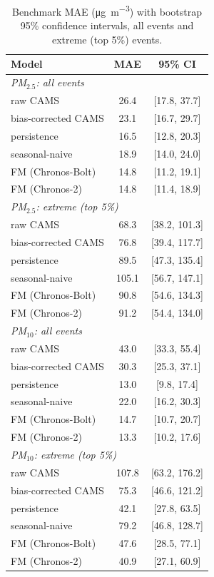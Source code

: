 \documentclass[11pt]{article}
\begin{document}
\begin{table}[htbp]\centering\footnotesize
\caption{Benchmark MAE (\si{\micro\gram\per\cubic\metre}) with bootstrap 95\% confidence intervals, all events and extreme (top 5\%) events.}
\begin{tabular}{lcc}\toprule
Model & MAE & 95\% CI \\ \midrule
\multicolumn{3}{l}{\textit{PM$_{2.5}$: all events}} \\
raw CAMS & 26.4 & [17.8, 37.7] \\
bias-corrected CAMS & 23.1 & [16.7, 29.7] \\
persistence & 16.5 & [12.8, 20.3] \\
seasonal-naive & 18.9 & [14.0, 24.0] \\
FM (Chronos-Bolt) & 14.8 & [11.2, 19.1] \\
FM (Chronos-2) & 14.8 & [11.4, 18.9] \\
\multicolumn{3}{l}{\textit{PM$_{2.5}$: extreme (top 5\%)}} \\
raw CAMS & 68.3 & [38.2, 101.3] \\
bias-corrected CAMS & 76.8 & [39.4, 117.7] \\
persistence & 89.5 & [47.3, 135.4] \\
seasonal-naive & 105.1 & [56.7, 147.1] \\
FM (Chronos-Bolt) & 90.8 & [54.6, 134.3] \\
FM (Chronos-2) & 91.2 & [54.4, 134.0] \\
\multicolumn{3}{l}{\textit{PM$_{10}$: all events}} \\
raw CAMS & 43.0 & [33.3, 55.4] \\
bias-corrected CAMS & 30.3 & [25.3, 37.1] \\
persistence & 13.0 & [9.8, 17.4] \\
seasonal-naive & 22.0 & [16.2, 30.3] \\
FM (Chronos-Bolt) & 14.7 & [10.7, 20.7] \\
FM (Chronos-2) & 13.3 & [10.2, 17.6] \\
\multicolumn{3}{l}{\textit{PM$_{10}$: extreme (top 5\%)}} \\
raw CAMS & 107.8 & [63.2, 176.2] \\
bias-corrected CAMS & 75.3 & [46.6, 121.2] \\
persistence & 42.1 & [27.8, 63.5] \\
seasonal-naive & 79.2 & [46.8, 128.7] \\
FM (Chronos-Bolt) & 47.6 & [28.5, 77.1] \\
FM (Chronos-2) & 40.9 & [27.1, 60.9] \\
\bottomrule\end{tabular}\end{table}
\end{document}
